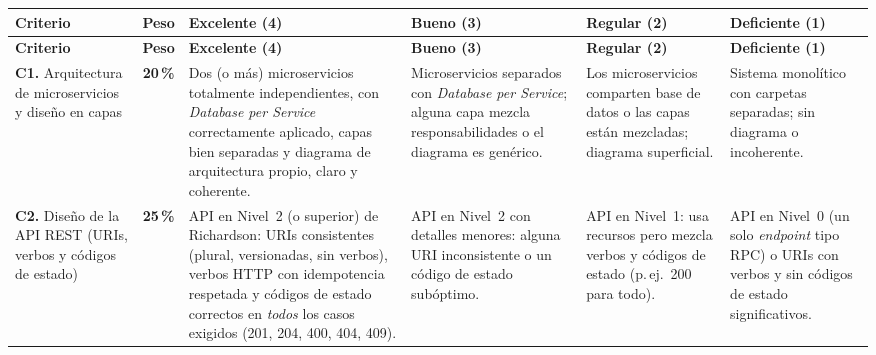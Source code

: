 \documentclass[11pt,a4paper]{article}
\begin{document}
\renewcommand{\arraystretch}{1.35}
\footnotesize
\begin{longtable}{|>{\raggedright\arraybackslash}p{}|c|>{\raggedright\arraybackslash}p{}|>{\raggedright\arraybackslash}p{}|>{\raggedright\arraybackslash}p{}|>{\raggedright\arraybackslash}p{}|}
    \hline
    \rowcolor{uteqBlue!15}
    \textbf{\color{uteqBlue}Criterio} &
    \textbf{\color{uteqBlue}Peso} &
    \textbf{\color{uteqBlue}Excelente (4)} &
    \textbf{\color{uteqBlue}Bueno (3)} &
    \textbf{\color{uteqBlue}Regular (2)} &
    \textbf{\color{uteqBlue}Deficiente (1)} \\
    \hline
    \endfirsthead

    \hline
    \rowcolor{uteqBlue!15}
    \textbf{\color{uteqBlue}Criterio} &
    \textbf{\color{uteqBlue}Peso} &
    \textbf{\color{uteqBlue}Excelente (4)} &
    \textbf{\color{uteqBlue}Bueno (3)} &
    \textbf{\color{uteqBlue}Regular (2)} &
    \textbf{\color{uteqBlue}Deficiente (1)} \\
    \hline
    \endhead

    \hline
    \endfoot

    \textbf{C1.} Arquitectura de microservicios y diseño en capas &
        \textbf{20\,\%} &
        Dos (o más) microservicios totalmente independientes, con \emph{Database per Service} correctamente aplicado, capas bien separadas y diagrama de arquitectura propio, claro y coherente. &
        Microservicios separados con \emph{Database per Service}; alguna capa mezcla responsabilidades o el diagrama es genérico. &
        Los microservicios comparten base de datos o las capas están mezcladas; diagrama superficial. &
        Sistema monolítico con carpetas separadas; sin diagrama o incoherente. \\
    \hline

    \textbf{C2.} Diseño de la API REST (URIs, verbos y códigos de estado) &
        \textbf{25\,\%} &
        API en Nivel~2 (o superior) de Richardson: URIs consistentes (plural, versionadas, sin verbos), verbos HTTP con idempotencia respetada y códigos de estado correctos en \emph{todos} los casos exigidos (201, 204, 400, 404, 409). &
        API en Nivel~2 con detalles menores: alguna URI inconsistente o un código de estado subóptimo. &
        API en Nivel~1: usa recursos pero mezcla verbos y códigos de estado (p.\,ej.\ 200 para todo). &
        API en Nivel~0 (un solo \emph{endpoint} tipo RPC) o URIs con verbos y sin códigos de estado significativos. \\
    \hline


\end{longtable}
\end{document}
